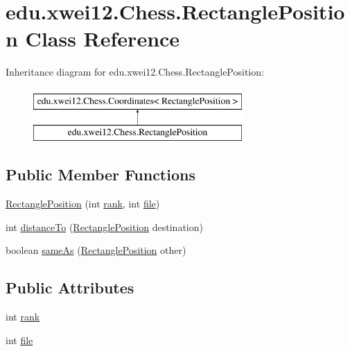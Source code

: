 \hypertarget{classedu_1_1xwei12_1_1_chess_1_1_rectangle_position}{}\section{edu.\+xwei12.\+Chess.\+Rectangle\+Position Class Reference}
\label{classedu_1_1xwei12_1_1_chess_1_1_rectangle_position}
Inheritance diagram for edu.\+xwei12.\+Chess.\+Rectangle\+Position\+:\begin{figure}[H]
\begin{center}
\leavevmode
\includegraphics[height=2.000000cm]{classedu_1_1xwei12_1_1_chess_1_1_rectangle_position}
\end{center}
\end{figure}
\subsection*{Public Member Functions}
\begin{DoxyCompactItemize}
\item 
\hyperlink{classedu_1_1xwei12_1_1_chess_1_1_rectangle_position_af3bb66f5d2c4c2c544ec879fd6a9274f}{Rectangle\+Position} (int \hyperlink{classedu_1_1xwei12_1_1_chess_1_1_rectangle_position_ac27be8af6f6e1398f1d3c73dc8c34363}{rank}, int \hyperlink{classedu_1_1xwei12_1_1_chess_1_1_rectangle_position_a39dcb7c30baa4025e919421f27dedfa1}{file})
\item 
int \hyperlink{classedu_1_1xwei12_1_1_chess_1_1_rectangle_position_a85550880e431c9c6211bbc81c86184f5}{distance\+To} (\hyperlink{classedu_1_1xwei12_1_1_chess_1_1_rectangle_position}{Rectangle\+Position} destination)
\item 
boolean \hyperlink{classedu_1_1xwei12_1_1_chess_1_1_rectangle_position_a241f7cc416865db8b2937aed6324208a}{same\+As} (\hyperlink{classedu_1_1xwei12_1_1_chess_1_1_rectangle_position}{Rectangle\+Position} other)
\end{DoxyCompactItemize}
\subsection*{Public Attributes}
\begin{DoxyCompactItemize}
\item 
int \hyperlink{classedu_1_1xwei12_1_1_chess_1_1_rectangle_position_ac27be8af6f6e1398f1d3c73dc8c34363}{rank}
\item 
int \hyperlink{classedu_1_1xwei12_1_1_chess_1_1_rectangle_position_a39dcb7c30baa4025e919421f27dedfa1}{file}
\end{DoxyCompactItemize}


